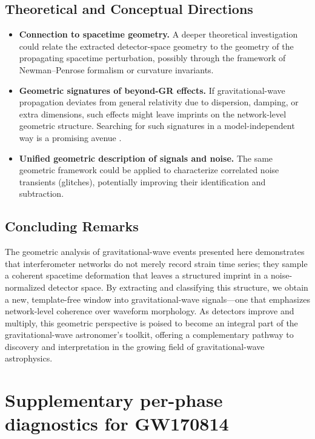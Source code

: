 \documentclass[11pt,a4paper]{article}
\begin{document}
\subsection{Theoretical and Conceptual Directions}
\begin{itemize}
    \item \textbf{Connection to spacetime geometry.} A deeper theoretical investigation could relate the extracted detector-space geometry to the geometry of the propagating spacetime perturbation, possibly through the framework of Newman--Penrose formalism or curvature invariants.

    \item \textbf{Geometric signatures of beyond-GR effects.} If gravitational-wave propagation deviates from general relativity due to dispersion, damping, or extra dimensions, such effects might leave imprints on the network-level geometric structure. Searching for such signatures in a model-independent way is a promising avenue \cite{Yunes2016, Abbott2025GRTestsGWTC3}.

    \item \textbf{Unified geometric description of signals and noise.} The same geometric framework could be applied to characterize correlated noise transients (glitches), potentially improving their identification and subtraction.
\end{itemize}

\subsection{Concluding Remarks}
The geometric analysis of gravitational-wave events presented here demonstrates that interferometer networks do not merely record strain time series; they sample a coherent spacetime deformation that leaves a structured imprint in a noise-normalized detector space. By extracting and classifying this structure, we obtain a new, template-free window into gravitational-wave signals—one that emphasizes network-level coherence over waveform morphology. As detectors improve and multiply, this geometric perspective is poised to become an integral part of the gravitational-wave astronomer’s toolkit, offering a complementary pathway to discovery and interpretation in the growing field of gravitational-wave astrophysics.

\appendix

\section{Supplementary per-phase diagnostics for GW170814}
\label{app:gw170814_diagnostics}
\end{document}
